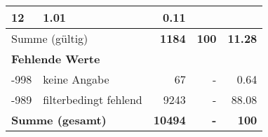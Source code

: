 \begin{longtable}{lXrrr}
       \num{12} &
       \num[round-mode=places,round-precision=2]{1.01} &
         \num[round-mode=places,round-precision=2]{0.11} \\
     \midrule
     \multicolumn{2}{l}{Summe (gültig)} &
       \textbf{\num{1184}} &
     \textbf{\num{100}} &
       \textbf{\num[round-mode=places,round-precision=2]{11.28}} \\
     \multicolumn{5}{l}{\textbf{Fehlende Werte}}\\
       -998 &
       keine Angabe &
         \num{67} &
        - &
         \num[round-mode=places,round-precision=2]{0.64} \\
       -989 &
       filterbedingt fehlend &
         \num{9243} &
        - &
         \num[round-mode=places,round-precision=2]{88.08} \\
     \midrule
     \multicolumn{2}{l}{\textbf{Summe (gesamt)}} &
          \textbf{\num{10494}} &
        \textbf{-} &
        \textbf{\num{100}} \\
     \bottomrule
     \end{longtable}
     
